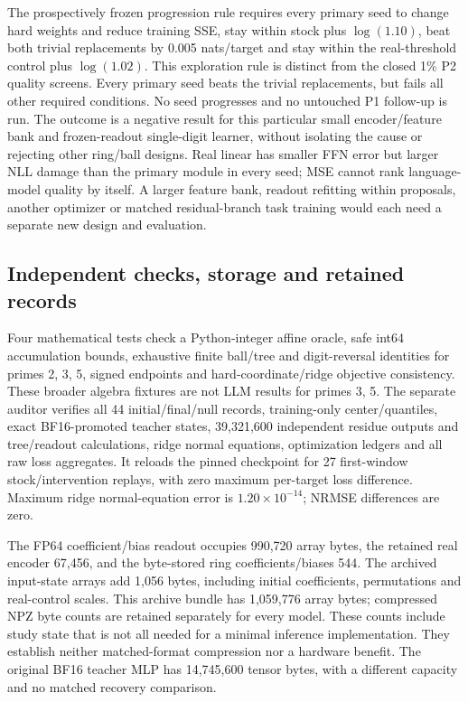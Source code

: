 \documentclass[11pt]{article}
\begin{document}
The prospectively frozen progression rule requires every primary seed to
change hard weights and reduce training SSE, stay within stock plus
\(\log(1.10)\), beat both trivial replacements by 0.005 nats/target and stay
within the real-threshold control plus \(\log(1.02)\). This exploration rule
is distinct from the closed 1\% P2 quality screens. Every primary seed beats
the trivial replacements, but fails all other required conditions. No
seed progresses and no untouched P1 follow-up is run. The outcome is a
negative result for this particular small encoder/feature bank and
frozen-readout single-digit learner, without isolating the cause or rejecting
other ring/ball designs. Real linear has smaller FFN error but larger NLL
damage than the primary module in every seed; MSE cannot rank language-model
quality by itself. A larger feature bank, readout refitting within proposals,
another optimizer or matched residual-branch task training would each need
a separate new design and evaluation.

\subsection{Independent checks, storage and retained records}

Four mathematical tests check a Python-integer affine oracle, safe int64
accumulation bounds, exhaustive finite ball/tree and digit-reversal identities
for primes 2, 3, 5, signed endpoints and hard-coordinate/ridge objective
consistency. These broader algebra fixtures are not LLM results for primes 3, 5.
The separate auditor verifies all 44 initial/final/null records, training-only
center/quantiles, exact BF16-promoted teacher states, 39,321,600 independent
residue outputs and tree/readout calculations, ridge normal equations,
optimization ledgers and all raw loss aggregates. It reloads the pinned
checkpoint for 27 first-window stock/intervention replays, with zero maximum
per-target loss difference. Maximum ridge normal-equation error is
\(1.20\times10^{-14}\); NRMSE differences are zero.

The FP64 coefficient/bias readout occupies 990,720 array bytes, the retained
real encoder 67,456, and the byte-stored ring coefficients/biases 544. The
archived input-state arrays add 1,056 bytes, including initial coefficients,
permutations and real-control scales. This archive bundle has 1,059,776 array
bytes; compressed NPZ byte counts are retained separately for every model.
These counts include study state that is not all needed for a minimal
inference implementation. They establish neither matched-format compression
nor a hardware benefit. The original BF16 teacher MLP has 14,745,600 tensor
bytes, with a different capacity and no matched recovery comparison.
\end{document}

